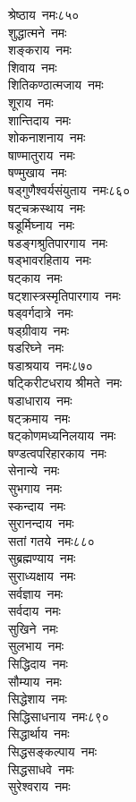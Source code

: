 \begin{multicols}{\maxColumns}
\begin{flushleft}
श्रेष्ठाय~नमः\hfill ८५०\\
शुद्धात्मने~नमः\\
शङ्कराय~नमः\\
शिवाय~नमः\\
शितिकण्ठात्मजाय~नमः\\
शूराय~नमः\\
शान्तिदाय~नमः\\
शोकनाशनाय~नमः\\
षाण्मातुराय~नमः\\
षण्मुखाय~नमः\\
षड्गुणैश्वर्यसंयुताय~नमः\hfill ८६०\\
षट्चक्रस्थाय~नमः\\
षडूर्मिघ्नाय~नमः\\
षडङ्गश्रुतिपारगाय~नमः\\
षड्भावरहिताय~नमः\\
षट्काय~नमः\\
षट्शास्त्रस्मृतिपारगाय~नमः\\
षड्वर्गदात्रे~नमः\\
षड्ग्रीवाय~नमः\\
षडरिघ्ने~नमः\\
षडाश्रयाय~नमः\hfill ८७०\\
षट्किरीटधराय श्रीमते~नमः\\
षडाधाराय~नमः\\
षट्क्रमाय~नमः\\
षट्कोणमध्यनिलयाय~नमः\\
षण्डत्वपरिहारकाय~नमः\\
सेनान्ये~नमः\\
सुभगाय~नमः\\
स्कन्दाय~नमः\\
सुरानन्दाय~नमः\\
सतां गतये~नमः\hfill ८८०\\
सुब्रह्मण्याय~नमः\\
सुराध्यक्षाय~नमः\\
सर्वज्ञाय~नमः\\
सर्वदाय~नमः\\
सुखिने~नमः\\
सुलभाय~नमः\\
सिद्धिदाय~नमः\\
सौम्याय~नमः\\
सिद्धेशाय~नमः\\
सिद्धिसाधनाय~नमः\hfill ८९०\\
सिद्धार्थाय~नमः\\
सिद्धसङ्कल्पाय~नमः\\
सिद्धसाधवे~नमः\\
सुरेश्वराय~नमः\\

\end{flushleft}
\end{multicols}
